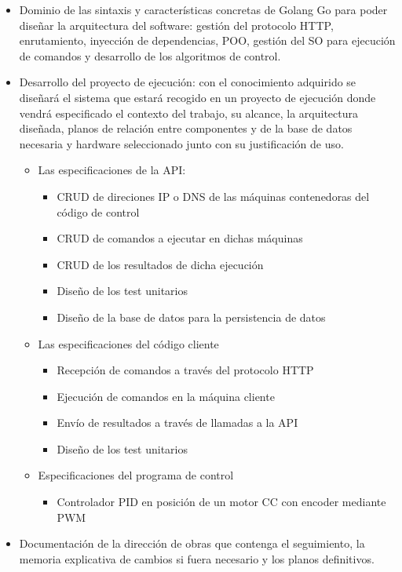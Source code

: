 \begin{itemize}
    \item Dominio de las sintaxis y características concretas de Golang Go para poder diseñar la arquitectura del software: gestión del protocolo HTTP, enrutamiento, inyección de dependencias, POO, gestión del SO para ejecución de comandos y desarrollo de los algoritmos de control.
    \item Desarrollo del proyecto de ejecución: con el conocimiento adquirido se diseñará el sistema que estará recogido en un proyecto de ejecución donde vendrá especificado el contexto del trabajo, su alcance, la arquitectura diseñada, planos de relación entre componentes y de la base de datos necesaria y hardware seleccionado junto con su justificación de uso.
    \begin{itemize}
        \item Las especificaciones de la API:
        \begin{itemize}
            \item \gls{CRUD} de direciones IP o DNS de las máquinas contenedoras del código de control
            \item CRUD de comandos a ejecutar en dichas máquinas
            \item CRUD de los resultados de dicha ejecución
            \item Diseño de los test unitarios
            \item Diseño de la base de datos para la persistencia de datos
        \end{itemize}
        \item Las especificaciones del código cliente
        \begin{itemize}
            \item Recepción de comandos a través del protocolo HTTP
            \item Ejecución de comandos en la máquina cliente
            \item Envío de resultados a través de llamadas a la API
            \item Diseño de los test unitarios
        \end{itemize}
        \item Especificaciones del programa de control
        \begin{itemize}
            \item Controlador PID en posición de un motor CC con encoder mediante PWM
        \end{itemize}
    \end{itemize}
    \item Documentación de la dirección de obras que contenga el seguimiento, la memoria explicativa de cambios si fuera necesario y los planos definitivos.
\end{itemize}

